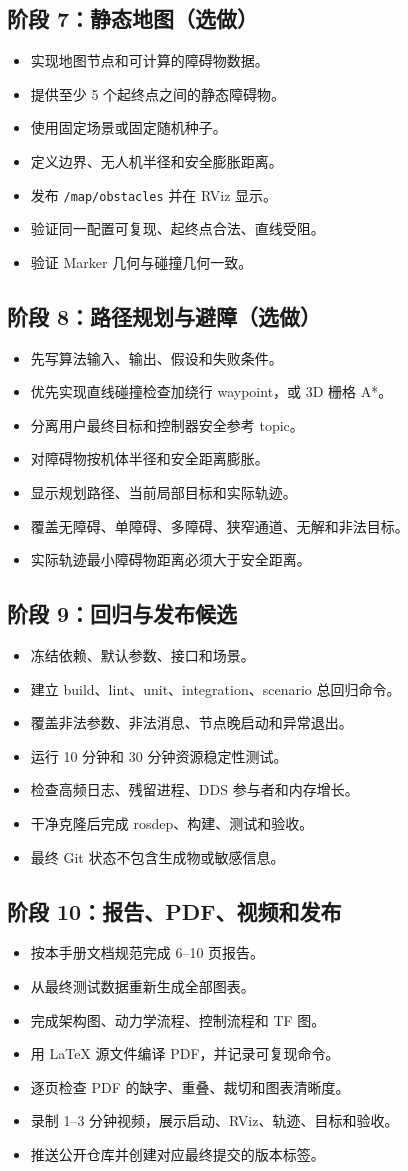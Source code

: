 \documentclass[UTF8,a4paper,12pt,fontset=fandol]{ctexart}
\newcommand{\unchecked}{\(\square\)}
\newcommand{\workitem}[1]{\item[\unchecked] #1}
\newcommand{\code}[1]{\texttt{#1}}
\begin{document}
\subsection{阶段 7：静态地图（选做）}

\begin{itemize}
  \workitem{实现地图节点和可计算的障碍物数据。}
  \workitem{提供至少 5 个起终点之间的静态障碍物。}
  \workitem{使用固定场景或固定随机种子。}
  \workitem{定义边界、无人机半径和安全膨胀距离。}
  \workitem{发布 \code{/map/obstacles} 并在 RViz 显示。}
  \workitem{验证同一配置可复现、起终点合法、直线受阻。}
  \workitem{验证 Marker 几何与碰撞几何一致。}
\end{itemize}

\subsection{阶段 8：路径规划与避障（选做）}

\begin{itemize}
  \workitem{先写算法输入、输出、假设和失败条件。}
  \workitem{优先实现直线碰撞检查加绕行 waypoint，或 3D 栅格 A*。}
  \workitem{分离用户最终目标和控制器安全参考 topic。}
  \workitem{对障碍物按机体半径和安全距离膨胀。}
  \workitem{显示规划路径、当前局部目标和实际轨迹。}
  \workitem{覆盖无障碍、单障碍、多障碍、狭窄通道、无解和非法目标。}
  \workitem{实际轨迹最小障碍物距离必须大于安全距离。}
\end{itemize}

\subsection{阶段 9：回归与发布候选}

\begin{itemize}
  \workitem{冻结依赖、默认参数、接口和场景。}
  \workitem{建立 build、lint、unit、integration、scenario 总回归命令。}
  \workitem{覆盖非法参数、非法消息、节点晚启动和异常退出。}
  \workitem{运行 10 分钟和 30 分钟资源稳定性测试。}
  \workitem{检查高频日志、残留进程、DDS 参与者和内存增长。}
  \workitem{干净克隆后完成 rosdep、构建、测试和验收。}
  \workitem{最终 Git 状态不包含生成物或敏感信息。}
\end{itemize}

\subsection{阶段 10：报告、PDF、视频和发布}

\begin{itemize}
  \workitem{按本手册文档规范完成 6--10 页报告。}
  \workitem{从最终测试数据重新生成全部图表。}
  \workitem{完成架构图、动力学流程、控制流程和 TF 图。}
  \workitem{用 LaTeX 源文件编译 PDF，并记录可复现命令。}
  \workitem{逐页检查 PDF 的缺字、重叠、裁切和图表清晰度。}
  \workitem{录制 1--3 分钟视频，展示启动、RViz、轨迹、目标和验收。}
  \workitem{推送公开仓库并创建对应最终提交的版本标签。}
\end{itemize}
\end{document}
